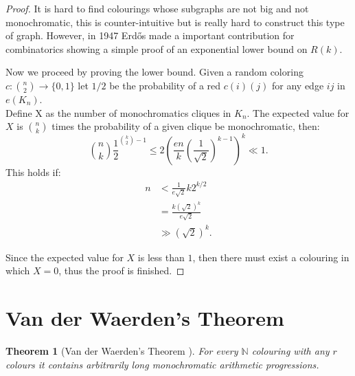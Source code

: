 \documentclass[12pt,twoside,a4paper]{book}
\numberwithin{equation}{section}
\newtheorem{theorem}             {Theorem}[section]
\theoremstyle{remark}
\begin{document}
\begin{proof}
It is hard to find colourings whose subgraphs are not big and not monochromatic, this is counter-intuitive but is really hard to construct this type of graph. However, in 1947 Erd\H{o}s made a important contribution for combinatorics showing a simple proof of an exponential lower bound on $R(k)$.

Now we proceed by proving the lower bound. Given a random coloring $c\colon \binom{n}{2} \rightarrow \{0,1\}$ let $1/2$ be the probability of a red $c(i)(j)$ for any edge $ij$ in $e(K_n)$.\\ 
Define X as the number of monochromatics cliques in $K_n$. The expected value for $X$ is $\binom{n}{k}$ times the probability of a given clique be monochromatic, then:
$$\binom{n}{k}\frac{1}{2} ^{\binom{k}{2}-1} \leq 2 \left( \frac{en}{k} \left( \frac{1}{\sqrt{2}} \right)^{k-1} \right)^{k} \ll 1.$$ 
This holds if: 
\begin{align*}
n &<\frac{1}{e\sqrt{2}}k2^{k/2} \\
& = \frac{k(\sqrt{2})^{k}}{e\sqrt{2}}\\
& \gg (\sqrt{2})^k.
\end{align*}

Since the expected value for $X$ is less than $1$, then there must exist a colouring in which $X=0$, thus the proof is finished.
\end{proof}

\section{Van der Waerden's Theorem}

\begin{theorem}[{Van der Waerden's Theorem \cite{Van27}}] %
 For every $\mathbb{N}$ colouring with any $r$ colours it contains arbitrarily long monochromatic arithmetic progressions. 
\end{theorem}
\end{document}
